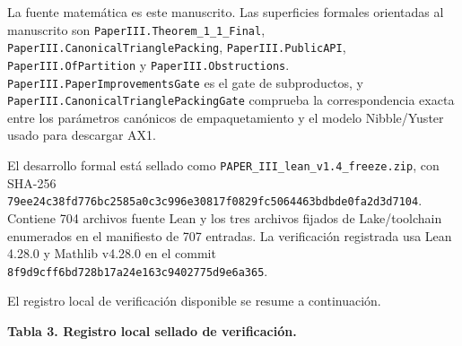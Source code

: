 \documentclass[
  spanish,
  11pt,
  a4paper,
]{article}
\begin{document}
La fuente matemática es este manuscrito. Las superficies formales orientadas al manuscrito son \texttt{PaperIII.Theorem\_1\_1\_Final}, \texttt{PaperIII.CanonicalTrianglePacking}, \texttt{PaperIII.PublicAPI}, \texttt{PaperIII.OfPartition} y \texttt{PaperIII.Obstructions}. \texttt{PaperIII.PaperImprovementsGate} es el gate de subproductos, y \texttt{PaperIII.CanonicalTrianglePacking\allowbreak{}Gate} comprueba la correspondencia exacta entre los parámetros canónicos de empaquetamiento y el modelo Nibble/Yuster usado para descargar AX1.

El desarrollo formal está sellado como \texttt{PAPER\_III\_lean\_v1.4\_freeze.zip}, con SHA-256 \texttt{79ee24c38fd776bc2585a0c3c996e30817f0829fc5064463bdbde0fa2d3d7104}. Contiene 704 archivos fuente Lean y los tres archivos fijados de Lake/toolchain enumerados en el manifiesto de 707 entradas. La verificación registrada usa Lean 4.28.0 y Mathlib v4.28.0 en el commit \texttt{8f9d9cff6bd728b17a24e163c9402775d9e6a365}.

El registro local de verificación disponible se resume a continuación.

\textbf{Tabla 3. Registro local sellado de verificación.}
\end{document}
